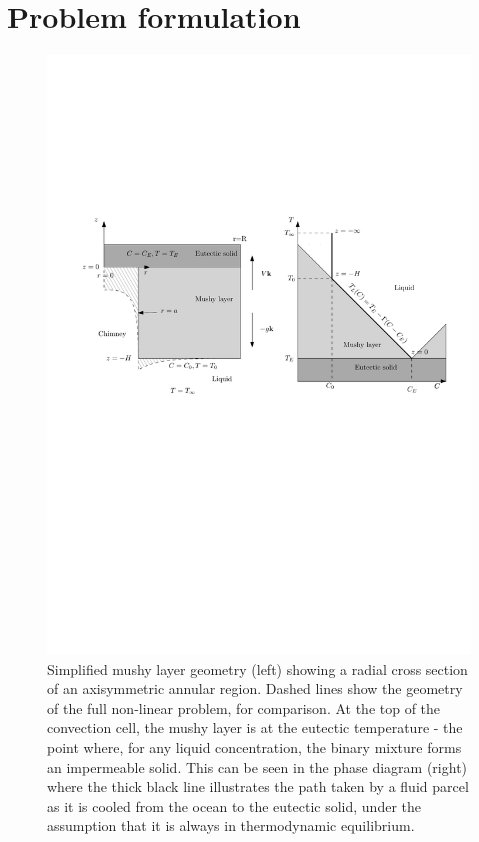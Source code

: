 \documentclass[11pt]{proc}
\begin{document}
\section{Problem formulation}
\label{sec:problem-formulation}

\begin{figure}[t]
       \centering
        \includegraphics[width=\textwidth]{simplified-arrangement}
        \setlength{\belowcaptionskip}{0pt} %
        
       \caption{Simplified mushy layer geometry (left) showing a radial cross section of an axisymmetric annular region. Dashed lines show the geometry of the full non-linear problem, for comparison. At the top of the convection cell, the mushy layer is at the eutectic temperature - the point where, for any liquid concentration, the binary mixture forms an impermeable solid. This can be seen in the phase diagram (right) where the thick black line illustrates the path taken by a fluid parcel as it is cooled from the ocean to the eutectic solid, under the assumption that it is always in thermodynamic equilibrium.}
    \label{fig:arrangement}
\end{figure}
\end{document}
